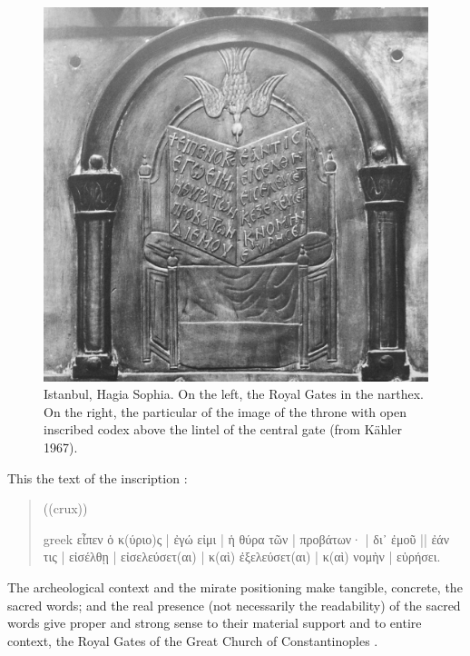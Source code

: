 \documentclass[amsthm,ebook]{saparticle}
\begin{document}
\begin{figure}[!bp]
\begin{minipage}[c]{0.57\textwidth}
 \includegraphics[width=\columnwidth]{FelleVisualFeaturesofinscriptionsEAGLE2016FullPaper-img013.jpg}
\end{minipage}
\caption{Istanbul, Hagia Sophia. On the left, the Royal Gates in the narthex. On the right, the particular of the image
of the throne with open inscribed codex above the lintel of the central gate (from Kähler 1967).}
\label{fig:9}
\end{figure}






This the text of the inscription \citep[n. 505]{felle_biblia_2006}: 

\begin{quotation}
((crux)) \begin{otherlanguage*}{greek}
εἶπεν ὁ κ(ύριο)ς \textlatin{|} ἐγώ εἰμι \textlatin{|} ἡ θύρα τῶν | προβάτων· \textlatin{|} δι᾿ ἐμοῦ \textlatin{||} ἐάν τις \textlatin{|} εἰσέλθῃ \textlatin{|} εἰσελεύσετ(αι) \textlatin{|} κ(αὶ) ἐξελεύσετ(αι) \textlatin{|} κ(αὶ) νομὴν \textlatin{|} εὑρήσει.
\end{otherlanguage*}


\end{quotation}

The archeological context and the mirate positioning make tangible, concrete, the sacred words; and the real presence
(not necessarily the readability) of the sacred words give proper and strong sense to their material support and to
entire context, the Royal Gates of the Great Church of Constantinoples \citep[320 and passim]{felle_esporre_2015}.
\end{document}
